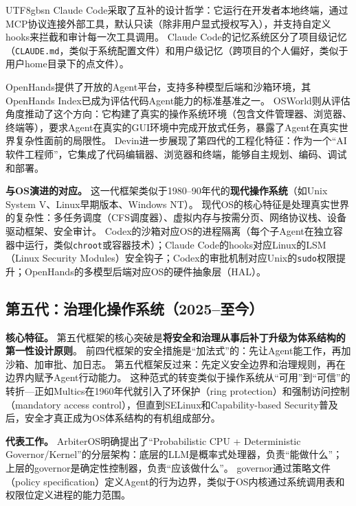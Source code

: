 \documentclass[11pt,a4paper]{article}
\begin{document}
\begin{CJK*}{UTF8}{gbsn}
Claude Code\cite{anthropic_claudecode_overview_2026}采取了互补的设计哲学：它运行在开发者本地终端，通过MCP协议\cite{mcp_intro_2026}连接外部工具，默认只读（除非用户显式授权写入），并支持自定义hooks来拦截和审计每一次工具调用\cite{anthropic_claudecode_security_2026}。
Claude Code的记忆系统\cite{anthropic_claudecode_memory_2026}区分了项目级记忆（\texttt{CLAUDE.md}，类似于系统配置文件）和用户级记忆（跨项目的个人偏好，类似于用户home目录下的点文件）。

OpenHands\cite{openhands_paper_2025}提供了开放的Agent平台，支持多种模型后端和沙箱环境，其OpenHands Index已成为评估代码Agent能力的标准基准之一。
OSWorld\cite{osworld2024}则从评估角度推动了这个方向：它构建了真实的操作系统环境（包含文件管理器、浏览器、终端等），要求Agent在真实的GUI环境中完成开放式任务，暴露了Agent在真实世界复杂性面前的局限性。
Devin\cite{devin2024cognition}进一步展现了第四代的工程化特征：作为一个``AI软件工程师''，它集成了代码编辑器、浏览器和终端，能够自主规划、编码、调试和部署。

\textbf{与OS演进的对应。}
这一代框架类似于1980--90年代的\textbf{现代操作系统}（如Unix System V、Linux早期版本、Windows NT）。
现代OS的核心特征是处理真实世界的复杂性：多任务调度（CFS调度器\cite{linux_cfs_2026}）、虚拟内存与按需分页、网络协议栈、设备驱动框架、安全审计。
Codex的沙箱对应OS的进程隔离（每个子Agent在独立容器中运行，类似\texttt{chroot}或容器技术）；Claude Code的hooks对应Linux的LSM（Linux Security Modules）安全钩子；Codex的审批机制对应Unix的\texttt{sudo}权限提升；OpenHands的多模型后端对应OS的硬件抽象层（HAL）。

\subsection*{第五代：治理化操作系统（2025--至今）}

\textbf{核心特征。}
第五代框架的核心突破是\textbf{将安全和治理从事后补丁升级为体系结构的第一性设计原则}。
前四代框架的安全措施是``加法式''的：先让Agent能工作，再加沙箱、加审批、加日志。
第五代框架反过来：先定义安全边界和治理规则，再在边界内赋予Agent行动能力。
这种范式的转变类似于操作系统从``可用''到``可信''的转折---正如Multics在1960年代就引入了环保护（ring protection）和强制访问控制（mandatory access control），但直到SELinux和Capability-based Security普及后，安全才真正成为OS体系结构的有机组成部分\cite{ostep_2023}。

\textbf{代表工作。}
ArbiterOS\cite{arbiteros2025}明确提出了``Probabilistic CPU + Deterministic Governor/Kernel''的分层架构：底层的LLM是概率式处理器，负责``能做什么''；上层的governor是确定性控制器，负责``应该做什么''。
governor通过策略文件（policy specification）定义Agent的行为边界，类似于OS内核通过系统调用表和权限位定义进程的能力范围。


\end{CJK*}
\end{document}
